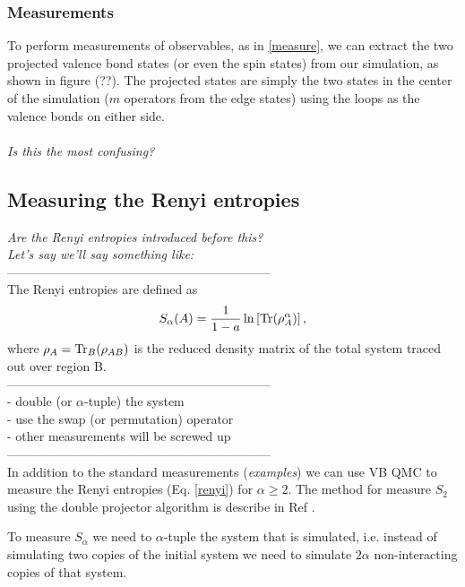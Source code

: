 \documentclass[prb,aps,twocolumn,floatfix,amsmath,amssymb,superscriptaddress,tightenlines]{revtex4}
\begin{document}
\subsubsection{Measurements}

To perform measurements of observables, as in \eqref{measure}, we can extract the two projected valence bond states (or even the spin states) from our simulation, as shown in figure (??).
The projected states are simply the two states in the center of the simulation ($m$ operators from the edge states) using the loops as the valence bonds on either side. 
\\\\
{\it Is this the most confusing?}

\subsection{Measuring the Renyi entropies}
{\it Are the Renyi entropies introduced before this?}\\ 
{\it Let's say we'll say something like:}\\
---------------------------------------------------------------\\
The Renyi entropies are defined as 
\begin{equation}
S_{\alpha}(A) = \frac{1}{1-a}\ln \left[ {\rm Tr}(\rho_A^{\alpha}) \right],
\end{equation}
where $\rho_A = {\rm Tr}_B (\rho_{AB})$ is the reduced density matrix of the total system traced out over region B.\\
---------------------------------------------------------------\\
\noindent
- {double (or $\alpha$-tuple) the system}\\
- {use the swap (or permutation) operator}\\
- {other measurements will be screwed up} \\
---------------------------------------------------------------\\


In addition to the standard measurements ({\it examples}) we can use VB QMC to measure the Renyi entropies (Eq. \eqref{renyi}) for $\alpha \ge 2$.  
The method for measure $S_2$ using the double projector algorithm is describe in Ref \cite{our paper}.

To measure $S_{\alpha}$ we need to $\alpha$-tuple the system that is simulated,
i.e. instead of simulating two copies of the initial system we need to simulate $2\alpha$ non-interacting copies of that system.
\end{document}
